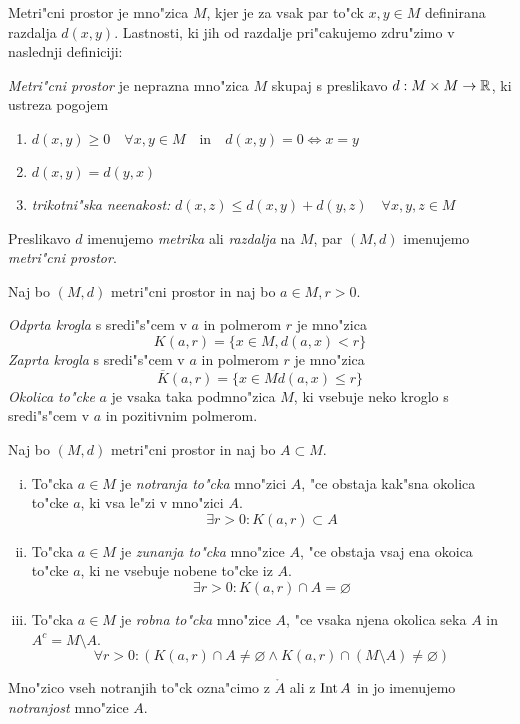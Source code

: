 Metri"cni prostor je mno"zica $M$, kjer je za vsak par to"ck $x, y \in M$ definirana razdalja $d(x, y)$. Lastnosti, ki jih od razdalje pri"cakujemo zdru"zimo v naslednji definiciji:

 \emph{Metri"cni prostor} je neprazna mno"zica $M$ skupaj s preslikavo $d: M \times M \to \mathbb{R}$, ki ustreza pogojem
\begin{enumerate}
    \item $d(x, y) \geq 0 \quad \forall x, y \in M \quad \text{in} \quad d(x, y) = 0 \iff x = y$
    \item $d(x, y) = d(y, x)$
    \item \emph{trikotni"ska neenakost:} $d(x, z) \leq d(x, y) + d(y, z) \quad \forall x, y, z \in M$
\end{enumerate}
Preslikavo $d$ imenujemo \emph{metrika} ali \emph{razdalja} na $M$, par $(M, d)$ imenujemo \emph{metri"cni prostor}.

 Naj bo $(M, d)$ metri"cni prostor in naj bo $a \in M, r > 0$.

\emph{Odprta krogla} s sredi"s"cem v $a$ in polmerom $r$ je mno"zica
\begin{equation*}
K(a, r) = \{x \in M, d(a, x) < r \}
\end{equation*}
\emph{Zaprta krogla} s sredi"s"cem v $a$ in polmerom $r$ je mno"zica
\begin{equation*}
\overline{K}(a, r) = \{ x \in M d(a, x) \leq r \}
\end{equation*}
\emph{Okolica to"cke} $a$ je vsaka taka podmno"zica $M$, ki vsebuje neko kroglo s sredi"s"cem v $a$ in pozitivnim polmerom.

 Naj bo $(M, d)$ metri"cni prostor in naj bo $A \subset M$.
\begin{enumerate}[(i)]
    \item To"cka $a \in M$ je \emph{notranja to"cka} mno"zici $A$, "ce obstaja kak"sna okolica to"cke $a$, ki vsa le"zi v mno"zici $A$.
    \begin{equation*}
    \exists r > 0: K(a, r) \subset A
    \end{equation*}
    
    \item To"cka $a \in M$ je \emph{zunanja to"cka} mno"zice $A$, "ce obstaja vsaj ena okoica to"cke $a$, ki ne vsebuje nobene to"cke iz $A$.
    \begin{equation*}
    \exists r > 0: K(a, r) \cap A = \varnothing
    \end{equation*}
    
    \item To"cka $a \in M$ je \emph{robna to"cka} mno"zice $A$, "ce vsaka njena okolica seka $A$ in $A^c = M \setminus A$.
    \begin{equation*}
    \forall r > 0:(K(a, r) \cap A \neq \varnothing \land K(a, r) \cap (M \setminus A) \neq \varnothing)
    \end{equation*}
\end{enumerate}
Mno"zico vseh notranjih to"ck ozna"cimo z $\mathring{A}$ ali z $\operatorname{Int} A$ in jo imenujemo \emph{notranjost} mno"zice $A$.

